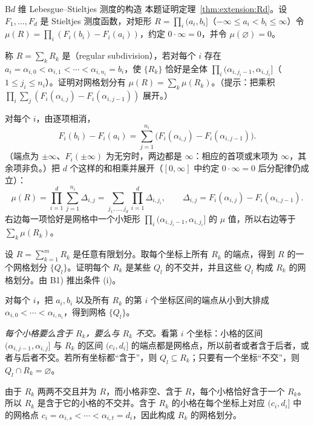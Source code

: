 \begin{probleme}{B}{$d$ 维 Lebesgue--Stieltjes 测度的构造}
本题证明定理~\ref{thm:extension:Rd}。设 $F_1,\dots,F_d$ 是 Stieltjes 测度函数，对矩形 $R=\prod_i(a_i,b_i]$（$-\infty\leqslant a_i<b_i\leqslant\infty$）令 $\mu(R)=\prod_i(F_i(b_i)-F_i(a_i))$，约定 $0\cdot\infty=0$，并令 $\mu(\varnothing)=0$。
\begin{questions}
\item 称 $R=\sum_kR_k$ 是（regular subdivision），若对每个 $i$ 存在 $a_i=\alpha_{i,0}<\alpha_{i,1}<\cdots<\alpha_{i,n_i}=b_i$，使 $\{R_k\}$ 恰好是全体 $\prod_i(\alpha_{i,j_i-1},\alpha_{i,j_i}]$（$1\leqslant j_i\leqslant n_i$）。证明对网格划分有 $\mu(R)=\sum_k\mu(R_k)$。（提示：把乘积 $\prod_i\sum_{j}(F_i(\alpha_{i,j})-F_i(\alpha_{i,j-1}))$ 展开。）
\begin{solution}
对每个 $i$，由逐项相消，
\[
F_i(b_i)-F_i(a_i)=\sum_{j=1}^{n_i}\bigl(F_i(\alpha_{i,j})-F_i(\alpha_{i,j-1})\bigr).
\]
（端点为 $\pm\infty$、$F_i(\pm\infty)$ 为无穷时，两边都是 $\infty$：相应的首项或末项为 $\infty$，其余项非负。）把 $d$ 个这样的和相乘并展开（$[0,\infty]$ 中约定 $0\cdot\infty=0$ 后分配律仍成立）：
\[
\mu(R)=\prod_{i=1}^d\sum_{j=1}^{n_i}\Delta_{i,j}=\sum_{j_1,\dots,j_d}\prod_{i=1}^d\Delta_{i,j_i},\qquad\Delta_{i,j}=F_i(\alpha_{i,j})-F_i(\alpha_{i,j-1}).
\]
右边每一项恰好是网格中一个小矩形 $\prod_i(\alpha_{i,j_i-1},\alpha_{i,j_i}]$ 的 $\mu$ 值，所以右边等于 $\sum_k\mu(R_k)$。
\end{solution}
\item 设 $R=\sum_{k=1}^mR_k$ 是任意有限划分。取每个坐标上所有 $R_k$ 的端点，得到 $R$ 的一个网格划分 $\{Q_l\}$。证明每个 $R_k$ 是某些 $Q_l$ 的不交并，并且这些 $Q_l$ 构成 $R_k$ 的网格划分。由 B1) 推出条件 (i)。
\begin{solution}
对每个 $i$，把 $a_i,b_i$ 以及所有 $R_k$ 的第 $i$ 个坐标区间的端点从小到大排成 $\alpha_{i,0}<\cdots<\alpha_{i,n_i}$，得到网格 $\{Q_l\}$。

\emph{每个小格要么含于 $R_k$，要么与 $R_k$ 不交。}看第 $i$ 个坐标：小格的区间 $(\alpha_{i,j-1},\alpha_{i,j}]$ 与 $R_k$ 的区间 $(c_i,d_i]$ 的端点都是网格点，所以前者或者含于后者，或者与后者不交。若所有坐标都“含于”，则 $Q_l\subseteq R_k$；只要有一个坐标“不交”，则 $Q_l\cap R_k=\varnothing$。

由于 $R_k$ 两两不交且并为 $R$，而小格非空、含于 $R$，每个小格恰好含于一个 $R_k$。所以 $R_k$ 是含于它的小格的不交并。含于 $R_k$ 的小格在每个坐标上对应 $(c_i,d_i]$ 中的网格点 $c_i=\alpha_{i,s}<\cdots<\alpha_{i,t}=d_i$，因此构成 $R_k$ 的网格划分。


\end{solution}
\end{questions}
\end{probleme}
